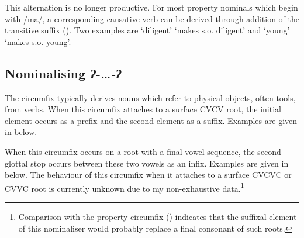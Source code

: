 This alternation is no longer productive.
For most property nominals which begin with /ma/,
a corresponding causative verb can be derived through
addition of the transitive suffix  ().
Two examples are  `diligent' {\ra}  `makes s.o. diligent'
and  `young' {\ra}  `makes s.o. young'.

\subsection{Nominalising \it{ʔ-{\ldots}-ʔ}}\label{sec:NomQ--q}
The circumfix 
typically derives nouns which refer to physical objects, often tools, from verbs.
When this circumfix attaches to a surface CVCV root,
the initial element occurs as a prefix and the second element as a suffix.
Examples are given in  below.

\begin{exe}
	\label{ex:NomCir2}
\end{exe}

When this circumfix occurs on a root with a final vowel sequence,
the second glottal stop occurs between these two vowels as an infix.
Examples are given in  below.
The behaviour of this circumfix when it attaches to a surface
CVCVC or CVVC root is currently unknown due to my non-exhaustive data.\footnote{
		Comparison with the property circumfix  ()
		indicates that the suffixal element of this nominaliser would probably
		replace a final consonant of such roots.}

\begin{exe}
	\label{ex:NomCirInf2}
\end{exe}

